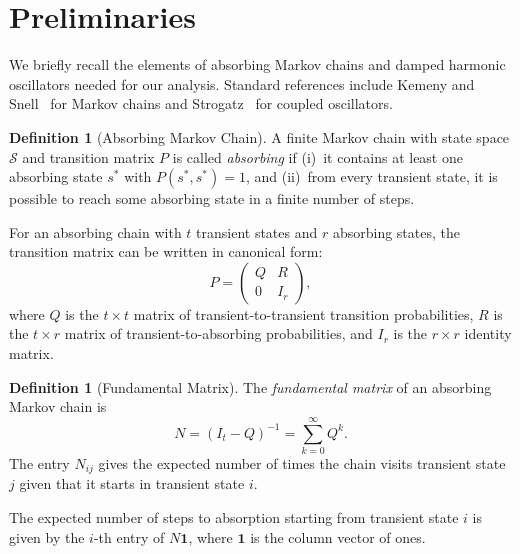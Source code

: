 \documentclass[journal]{IEEEtran}
\theoremstyle{definition}
\newtheorem{definition}[theorem]{Definition}
\theoremstyle{remark}
\begin{document}
\section{Preliminaries}\label{sec:prelim}

We briefly recall the elements of absorbing Markov chains and damped harmonic oscillators needed for our analysis. Standard references include Kemeny and Snell~\cite{kemeny1976} for Markov chains and Strogatz~\cite{strogatz2000} for coupled oscillators.

\begin{definition}[Absorbing Markov Chain]\label{def:absorbing}
A finite Markov chain with state space $\mathcal{S}$ and transition matrix $P$ is called \emph{absorbing} if (i)~it contains at least one absorbing state $s^*$ with $P(s^*, s^*) = 1$, and (ii)~from every transient state, it is possible to reach some absorbing state in a finite number of steps.
\end{definition}

For an absorbing chain with $t$ transient states and $r$ absorbing states, the transition matrix can be written in canonical form:
\begin{equation}\label{eq:canonical}
P = \begin{pmatrix} Q & R \\ 0 & I_r \end{pmatrix},
\end{equation}
where $Q$ is the $t \times t$ matrix of transient-to-transient transition probabilities, $R$ is the $t \times r$ matrix of transient-to-absorbing probabilities, and $I_r$ is the $r \times r$ identity matrix.

\begin{definition}[Fundamental Matrix]\label{def:fundamental}
The \emph{fundamental matrix} of an absorbing Markov chain is
\begin{equation}\label{eq:fundamental}
N = (I_t - Q)^{-1} = \sum_{k=0}^{\infty} Q^k.
\end{equation}
The entry $N_{ij}$ gives the expected number of times the chain visits transient state $j$ given that it starts in transient state $i$.
\end{definition}

The expected number of steps to absorption starting from transient state $i$ is given by the $i$-th entry of $N\mathbf{1}$, where $\mathbf{1}$ is the column vector of ones.
\end{document}
